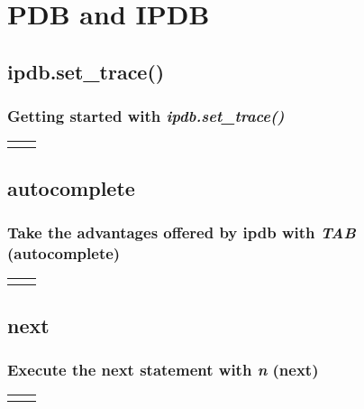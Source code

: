 \section{PDB and IPDB}

\subsection{ipdb.set\_trace()}
\begin{frame}
\frametitle{Getting started with \textit{\textbf{ipdb.set\_trace()}}}
\begin{table}
    \begin{tabular}{p{4.7cm}p{4.7cm}}
        &
        \lstset{basicstyle=\ttfamily\tiny}
        
    \end{tabular} 
\end{table}
\end{frame}

\subsection{autocomplete}
\begin{frame}
\frametitle{Take the advantages offered by ipdb with \textit{\textbf{TAB}} (autocomplete)}
\begin{table}
    \begin{tabular}{p{4.7cm}p{4.7cm}}
        \lstset{basicstyle=\ttfamily\tiny}
        &
        \lstset{basicstyle=\ttfamily\tiny}
        
    \end{tabular} 
\end{table}
\end{frame}

\subsection{next}
\begin{frame}
\frametitle{Execute the next statement with \textit{\textbf{n}} (next)}
\begin{table}
    \begin{tabular}{p{4.7cm}p{4.7cm}}
        &
        \lstset{basicstyle=\ttfamily\tiny}
        
    \end{tabular} 
\end{table}
\end{frame}

